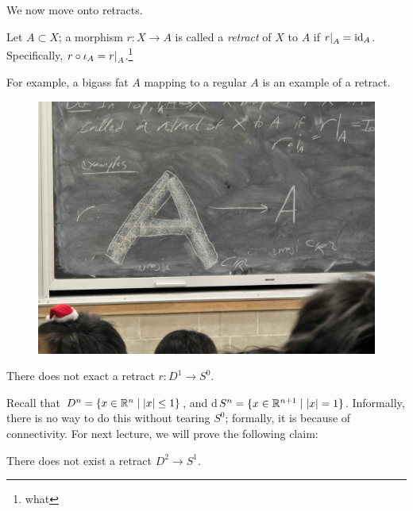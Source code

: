 \noindent We now move onto retracts.
\begin{definition}
    Let $A \subset X$; a morphism $r : X \to A$ is called a \textit{retract} of $X$ to $A$ if $\restr{r}{A} = \id_A$. Specifically, $r \circ \iota_A = \restr{r}{A}$.\footnote{what}
\end{definition}
\noindent For example, a bigass fat $A$ mapping to a regular $A$ is an example of a retract. 
\begin{figure}[h]
    \centering
    \includegraphics[scale=0.06]{MAT327 Notes/Blackboard Shots/Day 23 Retract.jpg}
\end{figure}

\newpage
\begin{simpleclaim}
    There does not exact a retract $r : D^1 \to S^0$.
\end{simpleclaim}
\noindent Recall that $D^n = \{x \in \mathbb R^n \mid \left\lvert x \right\rvert \leq 1\}$, and d$S^n = \{x \in \mathbb R^{n+1} \mid \left\lvert x \right\rvert = 1\}$. Informally, there is no way to do this without tearing $S^0$; formally, it is because of connectivity.
\medskip\newline
For next lecture, we will prove the following claim:
\begin{simpleclaim}
    There does not exist a retract $D^2 \to S^1$.
\end{simpleclaim}